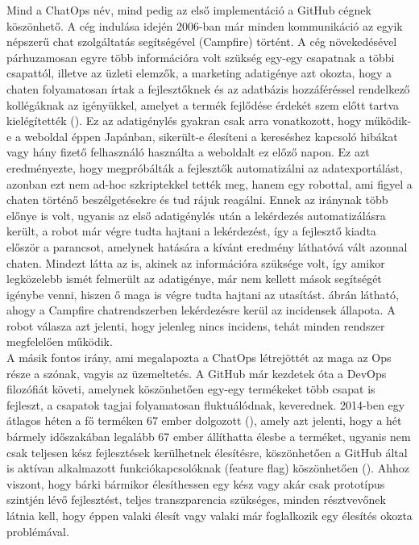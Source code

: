 Mind a ChatOps név, mind pedig az első implementáció a GitHub cégnek köszönhető. A cég indulása idején 2006-ban már minden kommunikáció az egyik népszerű chat szolgáltatás segítségével (Campfire) történt. A cég növekedésével párhuzamosan egyre több információra volt szükség egy-egy csapatnak a többi csapattól, illetve az üzleti elemzők, a marketing adatigénye azt okozta, hogy a chaten folyamatosan írtak a fejlesztőknek és az adatbázis hozzáféréssel rendelkező kollégáknak az igényükkel, amelyet a termék fejlődése érdekét szem előtt tartva kielégítették (\cite{what_is_chatops_slideshow}). Ez az adatigénylés gyakran csak arra vonatkozott, hogy működik-e a weboldal éppen Japánban, sikerült-e élesíteni a kereséshez kapcsoló hibákat vagy hány fizető felhasználó használta a weboldalt ez előző napon. Ez azt eredményezte, hogy megpróbálták a fejlesztők automatizálni az adatexportálást, azonban ezt nem ad-hoc szkriptekkel tették meg, hanem egy robottal, ami figyel a chaten történő beszélgetésekre és tud rájuk reagálni. Ennek az iránynak több előnye is volt, ugyanis az első adatigénylés után a lekérdezés automatizálásra került, a robot már végre tudta hajtani a lekérdezést, így a fejlesztő kiadta először a parancsot, amelynek hatására a kívánt eredmény láthatóvá vált azonnal chaten. Mindezt látta az is, akinek az információra szüksége volt, így amikor legközelebb ismét felmerült az adatigénye, már nem kellett mások segítségét igénybe venni, hiszen ő maga is végre tudta hajtani az utasítást.  ábrán látható, ahogy a Campfire chatrendszerben lekérdezésre kerül az incidensek állapota. A robot válasza azt jelenti, hogy jelenleg nincs incidens, tehát minden rendszer megfelelően működik. \\
A másik fontos irány, ami megalapozta a ChatOps létrejöttét az maga az Ops része a szónak, vagyis az üzemeltetés. A GitHub már kezdetek óta a DevOps filozófiát követi, amelynek köszönhetően egy-egy termékeket több csapat is fejleszt, a csapatok tagjai folyamatosan fluktuálódnak, keverednek.  2014-ben egy átlagos héten a fő terméken 67 ember dolgozott (\cite{github_product_team}), amely azt jelenti, hogy a hét bármely időszakában legalább 67 ember állíthatta élesbe a terméket, ugyanis nem csak teljesen kész fejlesztések kerülhetnek élesítésre, köszönhetően a GitHub által is aktívan alkalmazott funkciókapcsolóknak (feature flag) köszönhetően (\cite{github_feature_flag}). Ahhoz viszont, hogy bárki bármikor élesíthessen egy kész vagy akár csak prototípus szintjén lévő fejlesztést, teljes transzparencia szükséges, minden résztvevőnek látnia kell, hogy éppen valaki élesít vagy valaki már foglalkozik egy élesítés okozta problémával.\\
